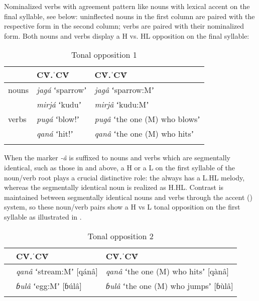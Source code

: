 \documentclass[output=paper]{LSP/langsci}
\begin{document}
Nominalized verbs with  agreement pattern like nouns with lexical accent on the final syllable, see  below: uninflected nouns in the first column are paired with the respective  form in the second column; verbs are paired with their  nominalized form. Both nouns and verbs display a H vs. HL opposition on the final syllable:

\begin{table}
\caption{Tonal opposition 1}
\label{tab:Petrollino:4}
 \begin{tabular}{lll} 
  \lsptoprule
            & CV̀.ˈCV́ & CV̀.ˈCV̂\\ 
  \midrule
nouns		& \textit{jagá} ʻsparrowʼ & \textit{jagâ} ʻsparrow:Mʼ  \\
			& \textit{mirjá} ʻkuduʼ & \textit{mirjâ} ʻkudu:Mʼ\\ 
verbs		& \textit{pugá} ʻblow!ʼ & \textit{pugâ} ʻthe one (M) who blowsʼ \\
			& \textit{qaná} ʻhit!ʼ & \textit{qanâ} ʻthe one (M) who hitsʼ\\
  \lspbottomrule
 \end{tabular}
\end{table}
When the  marker \textit{-â} is suffixed to nouns and verbs which are segmentally identical, such as those in  and  above, a H or a L  on the first syllable of the noun/verb root plays a crucial distinctive role: the  always has a L.HL melody, whereas the segmentally identical  noun is realized as H.HL. Contrast is maintained between segmentally identical nouns and verbs through the accent () system, so these noun/verb pairs show a H vs L tonal opposition on the first syllable as illustrated in . 

\begin{table}
\caption{Tonal opposition 2}
\label{tab:Petrollino:5}
 \begin{tabular}{lll} 
  \lsptoprule
            & CV́.ˈCV̂ & CV̀.ˈCV̂\\ 
  \midrule
		& \textit{qanâ} ʻstream:Mʼ [qánâ] & \textit{qanâ} ʻthe one (M) who hitsʼ [qànâ]\\
		& \textit{ɓulâ} ʻegg:Mʼ [ɓúlâ] & \textit{ɓulâ} ʻthe one (M) who jumpsʼ [ɓùlâ]\\
  \lspbottomrule
 \end{tabular}
\end{table}
\end{document}
